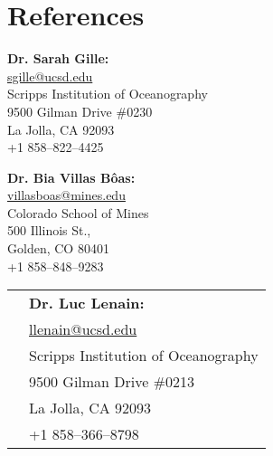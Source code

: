 \documentclass[10pt]{article}
\begin{document}
\vspace{.3cm}
\section*{References}
\vspace{.3cm}

\begin{minipage}[ht]{0.48\textwidth}
\begin{flushleft}
\textbf{Dr. Sarah Gille:} \\
\vspace{.1cm}
\url{sgille@ucsd.edu}\\
\vspace{.2cm}
\small{Scripps Institution of Oceanography}\\
\small{9500 Gilman Drive \#0230} \\
\small{La Jolla, CA 92093} \\
\small{+1 858--822--4425} 
\end{flushleft}
\end{minipage}
\hfill
\begin{minipage}[ht]{0.48\textwidth}
\begin{flushright}
\textbf{Dr. Bia Villas B\^{o}as:} \\
\vspace{.1cm}
\url{villasboas@mines.edu}\\
\vspace{.2cm}
\small{Colorado School of Mines}\\
\small{500 Illinois St.,} \\
\small{Golden, CO 80401} \\
\small{+1 858--848--9283} 
\end{flushright}
\end{minipage}
\hfill
\begin{center}
\begin{minipage}[ht]{0.48\textwidth}
\vspace{.1cm}
\begin{center}
\begin{tabular}{l  l }
& \textbf{Dr. Luc Lenain:} \\[5pt]
& \url{llenain@ucsd.edu} \\[5pt]
&\small{Scripps Institution of Oceanography}\\
&\small{9500 Gilman Drive \#0213} \\
&\small{La Jolla, CA 92093} \\
&\small{+1 858--366--8798} 
\end{tabular}
\end{center}
\end{minipage}
\end{center}
\end{document}
